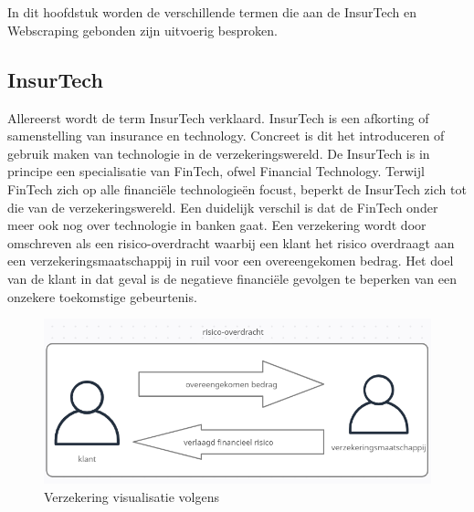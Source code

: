 \chapter{}
\label{ch:stand-van-zaken}



In dit hoofdstuk worden de verschillende termen die aan de InsurTech en Webscraping gebonden zijn uitvoerig besproken.

\section{InsurTech}
Allereerst wordt de term InsurTech verklaard.
InsurTech is een afkorting of samenstelling van insurance en technology.
Concreet is dit het introduceren of gebruik maken van technologie in de verzekeringswereld.
De InsurTech is in principe een specialisatie van FinTech, ofwel Financial Technology.
Terwijl FinTech zich op alle financiële technologieën focust, beperkt de InsurTech zich tot die van de verzekeringswereld.
Een duidelijk verschil is dat de FinTech onder meer ook nog over technologie in banken gaat.
Een verzekering wordt door \textcite{Trowbridge1975} omschreven als een risico-overdracht waarbij
een klant het risico overdraagt aan een verzekeringsmaatschappij in ruil voor een overeengekomen bedrag. 
Het doel van de klant in dat geval is de negatieve financiële gevolgen te beperken van een onzekere toekomstige gebeurtenis.
\graphicspath{ {./img/} }
\begin{figure}[H]
	\centering
	\includegraphics{creately_basic_verzekering}
	\caption{Verzekering visualisatie volgens \textcite{Trowbridge1975}}
\end{figure}

